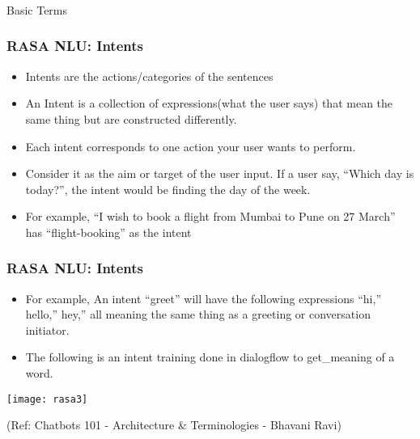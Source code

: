 \begin{frame}[fragile]\frametitle{}
\begin{center}
{\Large Basic Terms}

\end{center}
\end{frame}



 \begin{frame}[fragile]\frametitle{RASA NLU: Intents}
\begin{itemize}
\item Intents are the actions/categories of the sentences
\item An Intent is a collection of expressions(what the user says) that mean the same thing but are constructed differently. \item Each intent corresponds to one action your user wants to perform.
\item Consider it as the aim or target of the user input. If a user say, ``Which day is today?'', the intent would be finding the day of the week.
\item For example, ``I wish to book a flight from Mumbai to Pune on 27 March'' has ``flight-booking'' as the intent 
\end{itemize}
\end{frame}


 \begin{frame}[fragile]\frametitle{RASA NLU: Intents}
\begin{itemize}
\item For example, An intent “greet” will have the following expressions “hi,” hello,” hey,” all meaning the same thing as a greeting or conversation initiator.
\item The following is an intent training done in dialogflow to get\_meaning of a word.
\end{itemize}

\begin{center}
\texttt{[image: rasa3]}
\end{center}

{\tiny (Ref: Chatbots 101 - Architecture \& Terminologies -  Bhavani Ravi)}

\end{frame}


